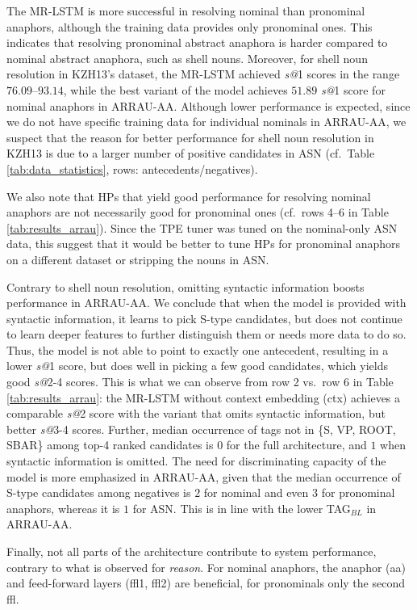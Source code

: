 \documentclass[11pt,letterpaper]{article}
\begin{document}
The MR-LSTM is more successful in resolving nominal than pronominal anaphors, although the training data provides only pronominal ones. This indicates that resolving pronominal
abstract anaphora is harder compared to nominal abstract anaphora, such as shell nouns. Moreover, for shell noun resolution in KZH13's dataset, the MR-LSTM achieved \textit{s@}1 scores in the range $76.09$--$93.14$, while the best variant of the model achieves $51.89$ \textit{s@}1 score for nominal anaphors in ARRAU-AA. Although lower performance is expected, since we do not have specific
training data for individual nominals in ARRAU-AA, we suspect that the reason for better performance for shell noun resolution in KZH13 is due to a larger number of positive candidates in ASN (cf.\ Table \ref{tab:data_statistics}, rows: antecedents/negatives). 

We also note that HPs that yield good performance for resolving nominal anaphors are not necessarily good for pronominal ones (cf.\ rows 4--6 in Table \ref{tab:results_arrau}). Since the TPE tuner was tuned on the nominal-only ASN data, this suggest that it would be better to tune HPs for pronominal anaphors on a different dataset or stripping the nouns in ASN. 

Contrary to shell noun resolution, omitting syntactic information boosts performance in ARRAU-AA. We conclude that when the model is provided with syntactic information, it learns to pick S-type candidates, but does not continue to learn deeper features to further distinguish them or needs more data to do so. Thus,
the model is not able to point to exactly one antecedent, resulting  in a lower \textit{s@}1 score, but does well in picking a few good candidates, which yields good \textit{s@}2-4 scores. This is what we can observe
from row 2 vs.\ row 6 in Table \ref{tab:results_arrau}: 
the MR-LSTM without context embedding (ctx) achieves a comparable \textit{s@}2 score with the variant that omits syntactic information, but better \textit{s@}3-4 scores. Further, median occurrence of tags not in \{S, VP, ROOT, SBAR\} among top-4 ranked candidates is $0$ for the full architecture, and $1$ when syntactic information is omitted. The need for discriminating capacity
of the model is more emphasized in ARRAU-AA, given that the median occurrence of S-type candidates among negatives is $2$ for nominal and even $3$ for pronominal anaphors, whereas it is $1$ for ASN.
This is in line with the lower TAG$_{BL}$ in ARRAU-AA. 

Finally, not all parts of the architecture contribute to system performance,
contrary to what is observed for
\textit{reason}. For nominal anaphors, 
the anaphor (aa) and feed-forward layers (ffl1, ffl2) are beneficial, for pronominals only the second
ffl.
\end{document}
